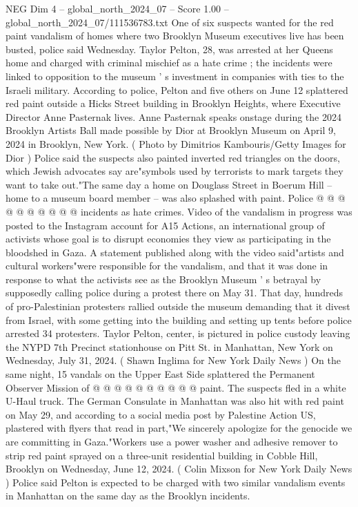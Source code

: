 \begin{textsample}{NEG Dim 4 – global\_north\_2024\_07 – Score 1.00 – global\_north\_2024\_07/111536783.txt}  \label{ex:f4_neg_282}
One of six suspects wanted for the red paint vandalism of homes where two Brooklyn Museum executives live has been busted, police said Wednesday.
Taylor Pelton, 28, was arrested at her Queens home and charged with criminal mischief as a hate crime ; the incidents were linked to opposition to the museum ' s investment in companies with ties to the Israeli military.
According to police, Pelton and five others on June 12 splattered red paint outside a Hicks Street building in Brooklyn Heights, where Executive Director Anne Pasternak lives.
Anne Pasternak speaks onstage during the 2024 Brooklyn Artists Ball made possible by Dior at Brooklyn Museum on April 9, 2024 in Brooklyn, New York. ( Photo by Dimitrios Kambouris/Getty Images for Dior ) Police said the suspects also painted inverted red triangles on the doors, which Jewish advocates say are"symbols used by terrorists to mark targets they want to take out."The same day a home on Douglass Street in Boerum Hill -- home to a museum board member -- was also splashed with paint.
Police @ @ @ @ @ @ @ @ @ @ incidents as hate crimes.
Video of the vandalism in progress was posted to the Instagram account for A15 Actions, an international group of activists whose goal is to disrupt economies they view as participating in the bloodshed in Gaza.
A statement published along with the video said"artists and cultural workers"were responsible for the vandalism, and that it was done in response to what the activists see as the Brooklyn Museum ' s betrayal by supposedly calling police during a protest there on May 31.
That day, hundreds of pro-Palestinian protesters rallied outside the museum demanding that it divest from Israel, with some getting into the building and setting up tents before police arrested 34 protesters.
Taylor Pelton, center, is pictured in police custody leaving the NYPD 7th Precinct stationhouse on Pitt St. in Manhattan, New York on Wednesday, July 31, 2024. ( Shawn Inglima for New York Daily News ) On the same night, 15 vandals on the Upper East Side splattered the Permanent Observer Mission of @ @ @ @ @ @ @ @ @ @ paint.
The suspects fled in a white U-Haul truck.
The German Consulate in Manhattan was also hit with red paint on May 29, and according to a social media post by Palestine Action US, plastered with flyers that read in part,"We sincerely apologize for the genocide we are committing in Gaza."Workers use a power washer and adhesive remover to strip red paint sprayed on a three-unit residential building in Cobble Hill, Brooklyn on Wednesday, June 12, 2024. ( Colin Mixson for New York Daily News ) Police said Pelton is expected to be charged with two similar vandalism events in Manhattan on the same day as the Brooklyn incidents.

\end{textsample}
